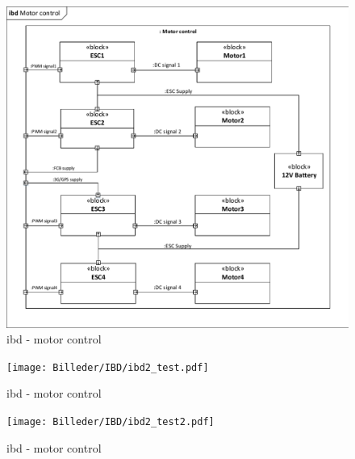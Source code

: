 \begin{figure}[H]
\centering
\includegraphics[width=1\textwidth]{Billeder/IBD/ibd6_motorcontrol.pdf}
\caption{ibd - motor control}
\label{fig:ibd_motorcontrol}
\end{figure}

\begin{figure}[H]
\centering
\texttt{[image: Billeder/IBD/ibd2\_test.pdf]}
\caption{ibd - motor control}
\label{fig:ibd_motorcontrol}
\end{figure}

\begin{figure}[H]
\centering
\texttt{[image: Billeder/IBD/ibd2\_test2.pdf]}
\caption{ibd - motor control}
\label{fig:ibd_motorcontrol}
\end{figure}